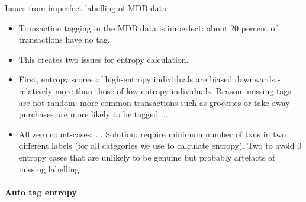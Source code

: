 Issues from imperfect labelling of MDB data:
\begin{itemize}

    \item Transaction tagging in the MDB data is imperfect: about 20 percent of
        transactions have no tag.

    \item This creates two issues for entropy calculation.

    \item First, entropy scores of high-entropy individuals are biased
        downwards - relatively more than those of low-entropy individuals.
        Reason: missing tags are not random: more common transactions such as
        groceries or take-away purchases are more likely to be tagged ...

    \item All zero count-cases: ... Solution: require minimum number of txns in
        two different labels (for all categories we use to calculate entropy).
        Two to avoid 0 entropy cases that are unlikely to be genuine but
        probably artefacts of missing labelling.
        
\end{itemize}



\paragraph{Auto tag entropy}%
\label{par:auto_tag_entropy}

